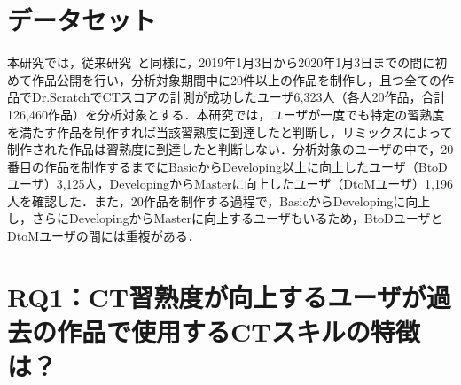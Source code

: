 \documentclass[submit,ses,noauthor]{ipsj}
\begin{document}



\section{データセット}\label{sec:chapter_3-1}
本研究では，従来研究~\cite{Ando_2021}と同様に，2019年1月3日から2020年1月3日までの間に初めて作品公開を行い，分析対象期間中に20件以上の作品を制作し，且つ全ての作品でDr.ScratchでCTスコアの計測が成功したユーザ6,323人（各人20作品，合計126,460作品）を分析対象とする．本研究では，ユーザが一度でも特定の習熟度を満たす作品を制作すれば当該習熟度に到達したと判断し，リミックスによって制作された作品は習熟度に到達したと判断しない．分析対象のユーザの中で，20番目の作品を制作するまでにBasicからDeveloping以上に向上したユーザ（BtoDユーザ）3,125人，DevelopingからMasterに向上したユーザ（DtoMユーザ）1,196人を確認した．また，20作品を制作する過程で，BasicからDevelopingに向上し，さらにDevelopingからMasterに向上するユーザもいるため，BtoDユーザとDtoMユーザの間には重複がある．

\section{RQ1：CT習熟度が向上するユーザが過去の作品で使用するCTスキルの特徴は？}\label{sec:chapter_3-2}
\vspace{-2mm}
\end{document}
